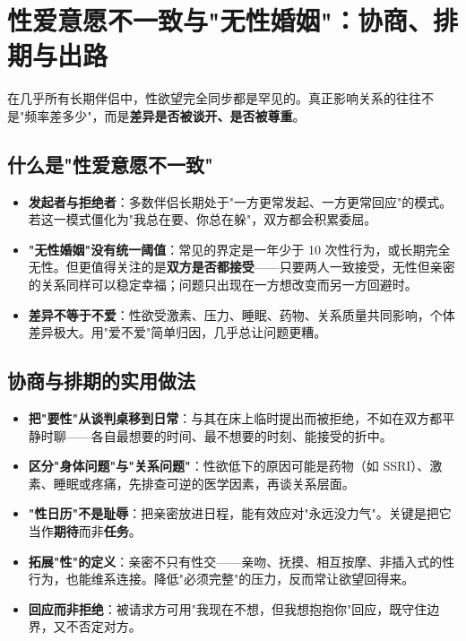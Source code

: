 \section{性爱意愿不一致与"无性婚姻"：协商、排期与出路}

在几乎所有长期伴侣中，性欲望完全同步都是罕见的。真正影响关系的往往不是"频率差多少"，而是\textbf{差异是否被谈开、是否被尊重}。

\subsection{什么是"性爱意愿不一致"}

\begin{itemize}
	\item \textbf{发起者与拒绝者}：多数伴侣长期处于"一方更常发起、一方更常回应"的模式。若这一模式僵化为"我总在要、你总在躲"，双方都会积累委屈。
	\item \textbf{"无性婚姻"没有统一阈值}：常见的界定是一年少于 10 次性行为，或长期完全无性。但更值得关注的是\textbf{双方是否都接受}——只要两人一致接受，无性但亲密的关系同样可以稳定幸福；问题只出现在一方想改变而另一方回避时。
	\item \textbf{差异不等于不爱}：性欲受激素、压力、睡眠、药物、关系质量共同影响，个体差异极大。用"爱不爱"简单归因，几乎总让问题更糟。
\end{itemize}

\subsection{协商与排期的实用做法}

\begin{itemize}
	\item \textbf{把"要性"从谈判桌移到日常}：与其在床上临时提出而被拒绝，不如在双方都平静时聊——各自最想要的时间、最不想要的时刻、能接受的折中。
	\item \textbf{区分"身体问题"与"关系问题"}：性欲低下的原因可能是药物（如 SSRI）、激素、睡眠或疼痛，先排查可逆的医学因素，再谈关系层面。
	\item \textbf{"性日历"不是耻辱}：把亲密放进日程，能有效应对"永远没力气"。关键是把它当作\textbf{期待}而非\textbf{任务}。
	\item \textbf{拓展"性"的定义}：亲密不只有性交——亲吻、抚摸、相互按摩、非插入式的性行为，也能维系连接。降低"必须完整"的压力，反而常让欲望回得来。
	\item \textbf{回应而非拒绝}：被请求方可用"我现在不想，但我想抱抱你"回应，既守住边界，又不否定对方。
\end{itemize}

